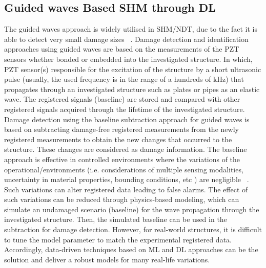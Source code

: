 \subsection{Guided waves Based SHM through DL}
The guided waves approach is widely utilised in SHM/NDT, due to the fact it is able to detect very small damage sizes ~\cite{Guemes2020}. 
Damage detection and identification approaches using guided waves are based on the measurements of the PZT sensors whether bonded or embedded into the investigated structure. 
In which, PZT sensor(s) responsible for the excitation of the structure by a short ultrasonic pulse (usually, the used frequency is in the range of a hundreds of kHz) that propagates through an investigated structure such as plates or pipes as an elastic wave.
The registered signals (baseline) are stored and compared with other registered signals acquired through the lifetime of the investigated structure.
Damage detection using the baseline subtraction approach for guided waves is based on subtracting damage-free registered measurements from the newly registered measurements to obtain the new changes that occurred to the structure.
These changes are considered as damage information.
The baseline approach is effective in controlled environments where the variations of the operational/environments (i.e. considerations of multiple sensing modalities, uncertainty in material properties, bounding conditions, etc ) are negligible ~\cite{Yuan2020}.  
Such variations can alter registered data leading to false alarms.
The effect of such variations can be reduced through physics-based modeling, which can simulate an undamaged scenario (baseline) for the wave propagation through the investigated structure.
Then, the simulated baseline can be used in the subtraction for damage detection.
However, for real-world structures, it is difficult to tune the model parameter to match the experimental registered data.
Accordingly, data-driven techniques based on ML and DL approaches can be the solution and deliver a robust models for many real-life variations.

